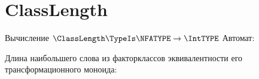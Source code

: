 \section{ClassLength}
\begin{frame}{Вычисление $\ClassLength\TypeIs\NFATYPE\to\IntTYPE$}
	Автомат:


	Длина наибольшего слова из факторклассов эквивалентности его трансформационного моноида:

\end{frame}
